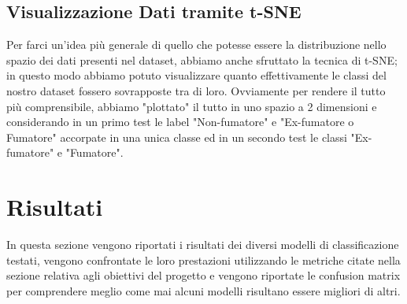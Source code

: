 \documentclass{article}
\begin{document}
\begin{multicols}{2}
\subsection{Visualizzazione Dati tramite t-SNE}

Per farci un'idea più generale di quello che potesse essere la distribuzione nello spazio dei dati presenti nel dataset, abbiamo anche sfruttato la tecnica di t-SNE; in questo modo abbiamo potuto visualizzare quanto effettivamente le classi del nostro dataset fossero sovrapposte tra di loro.
Ovviamente per rendere il tutto più comprensibile, abbiamo "plottato" il tutto in uno spazio a 2 dimensioni e considerando in un primo test le label "Non-fumatore" e "Ex-fumatore o Fumatore" accorpate in una unica classe ed in un secondo test le classi "Ex-fumatore" e "Fumatore".

\end{multicols}

\newpage

\section{Risultati}

In questa sezione vengono riportati i risultati dei diversi modelli di classificazione testati, vengono confrontate le loro prestazioni utilizzando le metriche citate nella sezione relativa agli obiettivi del progetto e vengono riportate le confusion matrix per comprendere meglio come mai alcuni modelli risultano essere migliori di altri.


\end{document}
